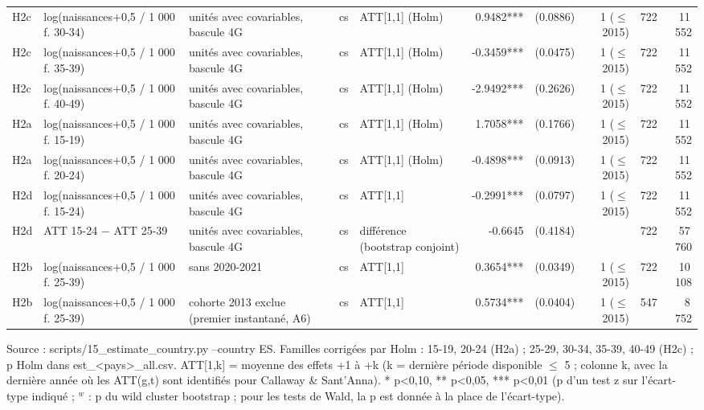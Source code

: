 \begin{table}
\begin{threeparttable}
\begin{tabular}{lp{4.8cm}p{5.1cm}lp{4.3cm}rrrrr}
H2c & log(naissances+0,5 / 1 000 f. 30-34) & unités avec covariables, bascule 4G & cs & ATT[1,1] (Holm) & 0.9482*** & (0.0886) & 1 ($\leq$ 2015) & 722 & 11\,552 \\
H2c & log(naissances+0,5 / 1 000 f. 35-39) & unités avec covariables, bascule 4G & cs & ATT[1,1] (Holm) & -0.3459*** & (0.0475) & 1 ($\leq$ 2015) & 722 & 11\,552 \\
H2c & log(naissances+0,5 / 1 000 f. 40-49) & unités avec covariables, bascule 4G & cs & ATT[1,1] (Holm) & -2.9492*** & (0.2626) & 1 ($\leq$ 2015) & 722 & 11\,552 \\
H2a & log(naissances+0,5 / 1 000 f. 15-19) & unités avec covariables, bascule 4G & cs & ATT[1,1] (Holm) & 1.7058*** & (0.1766) & 1 ($\leq$ 2015) & 722 & 11\,552 \\
H2a & log(naissances+0,5 / 1 000 f. 20-24) & unités avec covariables, bascule 4G & cs & ATT[1,1] (Holm) & -0.4898*** & (0.0913) & 1 ($\leq$ 2015) & 722 & 11\,552 \\
H2d & log(naissances+0,5 / 1 000 f. 15-24) & unités avec covariables, bascule 4G & cs & ATT[1,1] & -0.2991*** & (0.0797) & 1 ($\leq$ 2015) & 722 & 11\,552 \\
H2d & ATT 15-24 $-$ ATT 25-39 & unités avec covariables, bascule 4G & cs & différence (bootstrap conjoint) & -0.6645 & (0.4184) &  & 722 & 57\,760 \\
H2b & log(naissances+0,5 / 1 000 f. 25-39) & sans 2020-2021 & cs & ATT[1,1] & 0.3654*** & (0.0349) & 1 ($\leq$ 2015) & 722 & 10\,108 \\
H2b & log(naissances+0,5 / 1 000 f. 25-39) & cohorte 2013 exclue (premier instantané, A6) & cs & ATT[1,1] & 0.5734*** & (0.0404) & 1 ($\leq$ 2015) & 547 & 8\,752 \\
\bottomrule
\end{tabular}
\begin{tablenotes}\footnotesize
\item Source : scripts/15\_estimate\_country.py --country ES. Familles corrigées par Holm : 15-19, 20-24 (H2a) ; 25-29, 30-34, 35-39, 40-49 (H2c) ; p Holm dans est\_<pays>\_all.csv. ATT[1,k] = moyenne des effets +1 à +k (k = dernière période disponible $\leq$ 5 ; colonne k, avec la dernière année où les ATT(g,t) sont identifiés pour Callaway \& Sant'Anna). * p<0,10, ** p<0,05, *** p<0,01 (p d'un test z sur l'écart-type indiqué ; $^{w}$ : p du wild cluster bootstrap ; pour les tests de Wald, la p est donnée à la place de l'écart-type).
\end{tablenotes}
\end{threeparttable}
\end{table}
